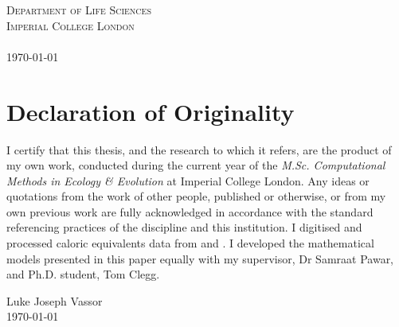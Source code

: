 \documentclass[a4paper]{article} %
\begin{document}
\begin{titlepage}
    \textsc{Department of Life Sciences \\ Imperial College London \\ \ }\\[1cm]
    \textsc{\today}\\[2cm] %
    
    \vfill %
    
\end{titlepage}

\section*{Declaration of Originality}\thispagestyle{plain}
    I certify that this thesis, and the research to which it refers, are the product of my own work, conducted during the current year of the \emph{M.Sc. Computational Methods in Ecology \& Evolution} at Imperial College London. Any ideas or quotations from the work of other people, published or otherwise, or from my own previous work are fully acknowledged in accordance with the standard referencing practices of the discipline and this institution. I digitised and processed caloric equivalents data from \textcite{Cummins1971} and \textcite{Steimle1980}. I developed the mathematical models presented in this paper equally with my supervisor, Dr Samraat Pawar, and Ph.D. student, Tom Clegg.

    \vspace{3cm}
    \begin{flushright}
        Luke Joseph Vassor \\
        \today
    \end{flushright}

\end{document}
